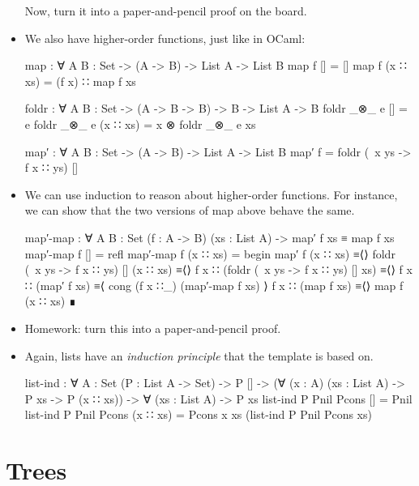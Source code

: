 \documentclass{lecturenotes}
\begin{document}
\begin{itemize}
Now, turn it into a paper-and-pencil proof on the board.

\item We also have higher-order functions, just like in OCaml:
\begin{code}
map : ∀ {A B : Set} -> (A -> B) -> List A -> List B
map f [] = []
map f (x ∷ xs) = (f x) ∷ map f xs
    
foldr : ∀ {A B : Set} -> (A -> B -> B) -> B -> List A -> B
foldr _⊗_ e [] = e
foldr _⊗_ e (x ∷ xs) = x ⊗ foldr _⊗_ e xs

map′ : ∀ {A B : Set} -> (A -> B) -> List A -> List B
map′ f = foldr (\ x ys -> f x ∷ ys) [] 
\end{code}

\item We can use induction to reason about higher-order functions.
  For instance, we can show that the two versions of map above behave the same.

\begin{code}
map′-map : ∀ {A B : Set} (f : A -> B) (xs : List A) -> map′ f xs ≡ map f xs
map′-map f [] = refl
map′-map f (x ∷ xs) =
  begin
    map′ f (x ∷ xs)
  ≡⟨⟩
    foldr (\ x ys -> f x ∷ ys) [] (x ∷ xs)
  ≡⟨⟩
    f x ∷ (foldr (\ x ys -> f x ∷ ys) [] xs)
  ≡⟨⟩
    f x ∷ (map′ f xs)
  ≡⟨ cong (f x ∷_) (map′-map f xs) ⟩
    f x ∷ (map f xs)
  ≡⟨⟩
    map f (x ∷ xs)
  ∎
\end{code}
\item Homework: turn this into a paper-and-pencil proof.

\item Again, lists have an \emph{induction principle} that the template is based on.
\begin{code}
list-ind : ∀ {A : Set} (P : List A -> Set) ->
  P [] ->
  (∀ (x : A) (xs : List A) -> P xs -> P (x ∷ xs)) ->
  ∀ (xs : List A) -> P xs
list-ind P Pnil Pcons [] = Pnil
list-ind P Pnil Pcons (x ∷ xs) = Pcons x xs (list-ind P Pnil Pcons xs)
\end{code}

\end{itemize}

\section{Trees}
\end{document}
